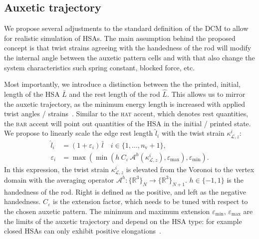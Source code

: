 \subsection{Auxetic trajectory}\label{sub:hsamodel:hsa_robot_simulation:auxetic_trajectory}
We propose several adjustments to the standard definition of the \gls{DCM} to allow for realistic simulation of \glspl{HSA}.
The main assumption behind the proposed concept is that twist strains agreeing with the handedness of the rod will modify the internal angle between the auxetic pattern cells and with that also change the system characteristics such spring constant, blocked force, etc.

Most importantly, we introduce a distinction between the the printed, initial, length of the \gls{HSA} $\bar{L}$ and the rest length of the rod $\hat{L}$. 
This allows us to mirror the auxetic trajectory, as the minimum energy length is increased with applied twist angles / strains~\cite{good2022expanding}.
Similar to the \textsc{hat} accent, which denotes rest quantities, the \textsc{bar} accent will point out quantities of the \gls{HSA} in the initial / printed state.
We propose to linearly scale the edge rest length $\hat{l}_i$ with the twist strain $\kappa_{\mathcal{L},z}^i$:
\begin{align}
    \hat{l}_i &= (1 + \varepsilon_i) \, \bar{l} \quad i\in \{1,\dots,n_\mathrm{v}+1\},\\
  \varepsilon_i &= \max \left (\min \left (h \: C_{\varepsilon} \, \mathcal{A}^h(\kappa_{\mathcal{L},z}^i),\varepsilon_\mathrm{max} \right ), \varepsilon_\mathrm{min} \right ).
\end{align}
In this expression, the twist strain $\kappa_{\mathcal{L},z}^i$ is elevated from the Voronoi to the vertex domain with the averaging operator $\mathcal{A}^h : \{\mathbb{R}^3 \}_N \rightarrow \{ \mathbb{R}^3 \}_{N+1}$. $h \in \{ -1, 1 \}$ is the handedness of the rod. Right is defined as the positive, and left as the negative handedness.
$C_{\varepsilon}$ is the extension factor, which needs to be tuned with respect to the chosen auxetic pattern.
The minimum and maximum extension $\varepsilon_\mathrm{min}$, $\varepsilon_\mathrm{max}$ are the limits of the auxetic trajectory and depend on the \gls{HSA} type: for example closed \glspl{HSA} can only exhibit positive elongations~\cite{good2022expanding}. %
